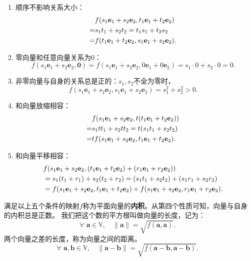 \documentclass[12pt,UTF8]{ctexbook}
\begin{document}
\begin{enumerate}
    \item 顺序不影响关系大小：
    \begin{align}
         & f(s_1\mathbf{e}_1 + s_2\mathbf{e}_2, t_1\mathbf{e}_1 + t_2\mathbf{e}_2) \notag \\
        =& s_1t_1 + s_2 t_2 = t_1s_1 + t_2s_2 \notag \\
        =& f(t_1\mathbf{e}_1 + t_2\mathbf{e}_2, s_1\mathbf{e}_1 + s_2\mathbf{e}_2). \notag
    \end{align}
    \item 零向量和任意向量关系为$0$：
    $$f(s_1\mathbf{e}_1 + s_2\mathbf{e}_2, \mathbf{0}) = f(s_1\mathbf{e}_1 + s_2\mathbf{e}_2, 0\mathbf{e}_1 + 0\mathbf{e}_2) = s_1\cdot 0 + s_2\cdot 0 = 0.$$
    \item 非零向量与自身的关系总是正的：$s_1, s_2$不全为零时，
    $$f(s_1\mathbf{e}_1 + s_2\mathbf{e}_2, s_1\mathbf{e}_1 + s_2\mathbf{e}_2) = s_1^2 + s_2^2  > 0.$$
    \item 和向量放缩相容：
    \begin{align}
        & f(s_1\mathbf{e}_1 + s_2\mathbf{e}_2, t(t_1\mathbf{e}_1 + t_2\mathbf{e}_2)) \notag \\
        =& s_1tt_1 + s_2 tt_2 = t(s_1t_1 + s_2t_2) \notag \\
        =& tf(s_1\mathbf{e}_1 + s_2\mathbf{e}_2, t_1\mathbf{e}_1 + t_2\mathbf{e}_2). \notag 
    \end{align}
    \item 和向量平移相容：
    \begin{align}
         & f(s_1\mathbf{e}_1 + s_2\mathbf{e}_2, (t_1\mathbf{e}_1 + t_2\mathbf{e}_2) + (r_1\mathbf{e}_1 + r_2\mathbf{e}_2)) \notag \\
        &= s_1(t_1 + r_1) + s_2 (t_2 + r_2) = (s_1t_1 + s_2t_2) + (s_1r_1 + s_2r_2) \notag \\
        &= f(s_1\mathbf{e}_1 + s_2\mathbf{e}_2, t_1\mathbf{e}_1 + t_2\mathbf{e}_2) + f(s_1\mathbf{e}_1 + s_2\mathbf{e}_2, r_1\mathbf{e}_1 + r_2\mathbf{e}_2). \notag
    \end{align}     
\end{enumerate}
满足以上五个条件的映射$f$称为平面向量的\textbf{内积}。从第四个性质可知，向量与自身的内积总是正数。
我们把这个数的平方根叫做向量的长度，记为：
$$ \forall \,\, \mathbf{a} \in \mathbb{V}, \quad \| \mathbf{a}\| = \sqrt{f(\mathbf{a}, \mathbf{a})}. $$
两个向量之差的长度，称为向量之间的距离。
$$ \forall \,\, \mathbf{a}, \mathbf{b} \in \mathbb{V}, \quad \| \mathbf{a} - \mathbf{b}\| = \sqrt{f(\mathbf{a} - \mathbf{b}, \mathbf{a} - \mathbf{b})}. $$
\end{document}
